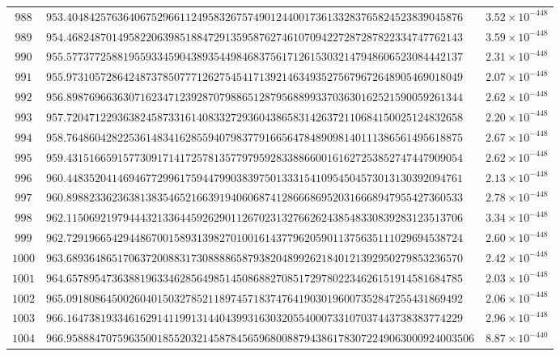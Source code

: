 \documentclass[12pt,reqno]{amsart}
\theoremstyle{remark}
\begin{document}
\begin{longtable}{clc}
$988$ & $953.4048425763640675296611249583267574901244001736133283765824523839045876$ & $3.52\times 10^{-448}$ \\
$989$ & $954.4682487014958220639851884729135958762746107094227287287822334747762143$ & $3.59\times 10^{-448}$ \\
$990$ & $955.5773772588195593345904389354498468375617126153032147948606523084442137$ & $2.31\times 10^{-448}$ \\
$991$ & $955.9731057286424873785077712627545417139214634935275679672648905469018049$ & $2.07\times 10^{-448}$ \\
$992$ & $956.8987696636307162347123928707988651287956889933703630162521590059261344$ & $2.62\times 10^{-448}$ \\
$993$ & $957.7204712293638245873316140833272936043865831426372110684150025124832658$ & $2.20\times 10^{-448}$ \\
$994$ & $958.7648604282253614834162855940798377916656478489098140111386561495618875$ & $2.67\times 10^{-448}$ \\
$995$ & $959.4315166591577309171417257813577979592833886600161627253852747447909054$ & $2.62\times 10^{-448}$ \\
$996$ & $960.4483520414694677299617594479903839750133315410954504573013130392094761$ & $2.13\times 10^{-448}$ \\
$997$ & $960.8988233623638138354652166391940606874128666869520316668947955427360533$ & $2.78\times 10^{-448}$ \\
$998$ & $962.1150692197944432133644592629011267023132766262438548330839283123513706$ & $3.34\times 10^{-448}$ \\
$999$ & $962.7291966542944867001589313982701001614377962059011375635111029694538724$ & $2.60\times 10^{-448}$ \\
$1000$ & $963.6893648651706372008831730888865879382048992621840121392950279853236570$ & $2.42\times 10^{-448}$ \\
$1001$ & $964.6578954736388196334628564985145086882708517297802234626151914581684785$ & $2.03\times 10^{-448}$ \\
$1002$ & $965.0918086450026040150327852118974571837476419030196007352847255431869492$ & $2.06\times 10^{-448}$ \\
$1003$ & $966.1647381933461629141199131440439931630320554000733107037443738383774229$ & $2.96\times 10^{-448}$ \\
$1004$ & $966.958884707596350018552032145878456596800887943861783072249063000924003506$ & $8.87\times 10^{-440}$ \\

\end{longtable}
\end{document}
